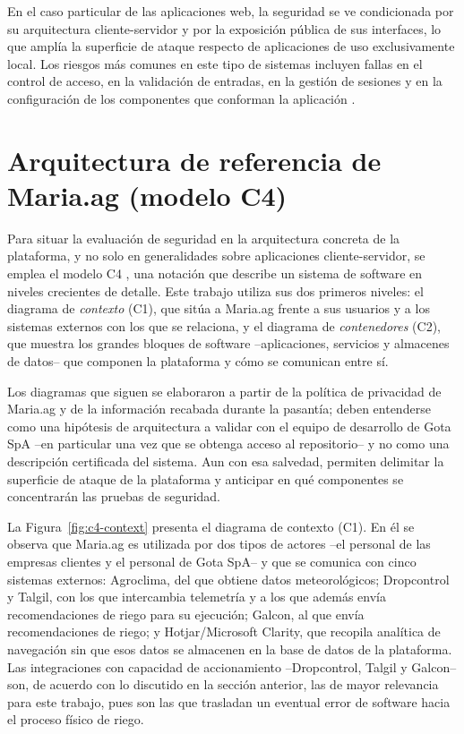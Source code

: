\documentclass[12pt,letterpaper]{report}
\begin{document}
En el caso particular de las aplicaciones web, la seguridad se ve condicionada
por su arquitectura cliente-servidor y por la exposición pública de sus
interfaces, lo que amplía la superficie de ataque respecto de aplicaciones de
uso exclusivamente local. Los riesgos más comunes en este tipo de sistemas
incluyen fallas en el control de acceso, en la validación de entradas, en la
gestión de sesiones y en la configuración de los componentes que conforman la
aplicación \autocite{owasp2025top10}.

\section*{Arquitectura de referencia de Maria.ag (modelo C4)}

Para situar la evaluación de seguridad en la arquitectura concreta de la
plataforma, y no solo en generalidades sobre aplicaciones cliente-servidor, se
emplea el modelo C4 \autocite{brown2018c4}, una notación que describe un
sistema de software en niveles crecientes de detalle. Este trabajo utiliza sus
dos primeros niveles: el diagrama de \textit{contexto} (C1), que sitúa a
Maria.ag frente a sus usuarios y a los sistemas externos con los que se
relaciona, y el diagrama de \textit{contenedores} (C2), que muestra los
grandes bloques de software --aplicaciones, servicios y almacenes de datos--
que componen la plataforma y cómo se comunican entre sí.

Los diagramas que siguen se elaboraron a partir de la política de privacidad
de Maria.ag y de la información recabada durante la pasantía; deben
entenderse como una hipótesis de arquitectura a validar con el equipo de
desarrollo de Gota SpA --en particular una vez que se obtenga acceso al
repositorio-- y no como una descripción certificada del sistema. Aun con esa
salvedad, permiten delimitar la superficie de ataque de la plataforma y
anticipar en qué componentes se concentrarán las pruebas de seguridad.

La Figura~\ref{fig:c4-context} presenta el diagrama de contexto (C1). En él
se observa que Maria.ag es utilizada por dos tipos de actores --el personal
de las empresas clientes y el personal de Gota SpA-- y que se comunica con
cinco sistemas externos: Agroclima, del que obtiene datos meteorológicos;
Dropcontrol y Talgil, con los que intercambia telemetría y a los que además
envía recomendaciones de riego para su ejecución; Galcon, al que envía
recomendaciones de riego; y Hotjar/Microsoft Clarity, que recopila analítica
de navegación sin que esos datos se almacenen en la base de datos de la
plataforma. Las integraciones con capacidad de accionamiento --Dropcontrol,
Talgil y Galcon-- son, de acuerdo con lo discutido en la sección anterior, las
de mayor relevancia para este trabajo, pues son las que trasladan un eventual
error de software hacia el proceso físico de riego.
\end{document}
